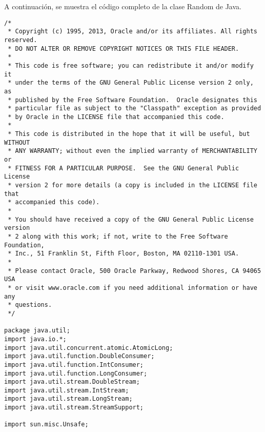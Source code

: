 \documentclass[12pt,a4paper,twoside,openright,titlepage,final]{article}
\begin{document}
A continuación, se muestra el código completo de la clase Random de Java.

\begin{verbatim}
/*
 * Copyright (c) 1995, 2013, Oracle and/or its affiliates. All rights reserved.
 * DO NOT ALTER OR REMOVE COPYRIGHT NOTICES OR THIS FILE HEADER.
 *
 * This code is free software; you can redistribute it and/or modify it
 * under the terms of the GNU General Public License version 2 only, as
 * published by the Free Software Foundation.  Oracle designates this
 * particular file as subject to the "Classpath" exception as provided
 * by Oracle in the LICENSE file that accompanied this code.
 *
 * This code is distributed in the hope that it will be useful, but WITHOUT
 * ANY WARRANTY; without even the implied warranty of MERCHANTABILITY or
 * FITNESS FOR A PARTICULAR PURPOSE.  See the GNU General Public License
 * version 2 for more details (a copy is included in the LICENSE file that
 * accompanied this code).
 *
 * You should have received a copy of the GNU General Public License version
 * 2 along with this work; if not, write to the Free Software Foundation,
 * Inc., 51 Franklin St, Fifth Floor, Boston, MA 02110-1301 USA.
 *
 * Please contact Oracle, 500 Oracle Parkway, Redwood Shores, CA 94065 USA
 * or visit www.oracle.com if you need additional information or have any
 * questions.
 */

package java.util;
import java.io.*;
import java.util.concurrent.atomic.AtomicLong;
import java.util.function.DoubleConsumer;
import java.util.function.IntConsumer;
import java.util.function.LongConsumer;
import java.util.stream.DoubleStream;
import java.util.stream.IntStream;
import java.util.stream.LongStream;
import java.util.stream.StreamSupport;

import sun.misc.Unsafe;


\end{verbatim}
\end{document}
